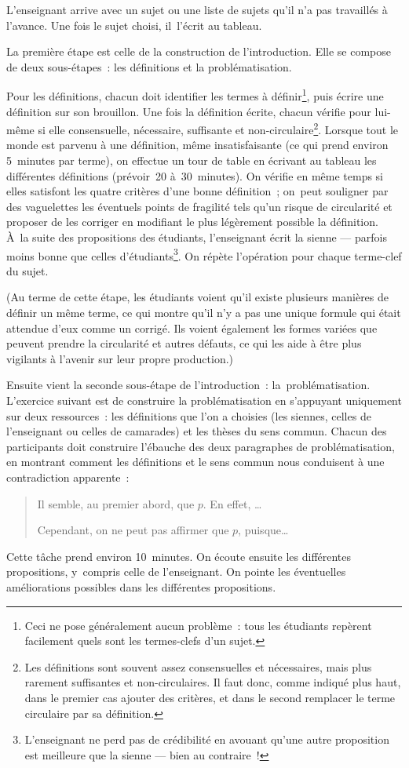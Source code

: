 \documentclass[a4paper,12pt]{report}
\begin{document}
L'enseignant arrive avec un sujet ou une liste de sujets qu'il n'a pas
travaillés à l'avance. Une fois le sujet choisi, il l'écrit au tableau.

La première étape est celle de la construction de l'introduction. Elle
se compose de deux sous-étapes : les définitions et la problématisation.

Pour les définitions, chacun doit identifier les termes à définir\footnote{Ceci ne pose généralement aucun problème : tous les étudiants
repèrent facilement quels sont les termes-clefs d'un sujet.},
puis écrire une définition sur son brouillon. Une fois la définition
écrite, chacun vérifie pour lui-même si elle consensuelle, nécessaire,
suffisante et non-circulaire\footnote{Les définitions sont souvent assez consensuelles et nécessaires,
mais plus rarement suffisantes et non-circulaires. Il faut donc, comme
indiqué plus haut, dans le premier cas ajouter des critères, et dans le
second remplacer le terme circulaire par sa définition.}. Lorsque tout le monde est parvenu à
une définition, même insatisfaisante (ce qui prend environ 5 minutes par
terme), on effectue un tour de table en écrivant au tableau les
différentes définitions (prévoir 20 à 30 minutes). On vérifie en même
temps si elles satisfont les quatre critères d'une bonne définition ;
on peut souligner par des vaguelettes les éventuels points de fragilité
tels qu'un risque de circularité et proposer de les corriger en
modifiant le plus légèrement possible la définition. À la suite des
propositions des étudiants, l'enseignant écrit la sienne — parfois moins
bonne que celles d'étudiants\footnote{L'enseignant ne perd pas de crédibilité en avouant qu'une autre
proposition est meilleure que la sienne --- bien au contraire !}. On répète l'opération pour chaque
terme-clef du sujet.

(Au terme de cette étape, les étudiants voient qu'il existe plusieurs
manières de définir un même terme, ce qui montre qu'il n'y a pas une
unique formule qui était attendue d'eux comme un corrigé. Ils voient
également les formes variées que peuvent prendre la circularité et
autres défauts, ce qui les aide à être plus vigilants à l'avenir sur
leur propre production.)

Ensuite vient la seconde sous-étape de l'introduction :
la problématisation. L'exercice suivant est de construire la
problématisation en s'appuyant uniquement sur deux ressources : les
définitions que l'on a choisies (les siennes, celles de l'enseignant ou
celles de camarades) et les thèses du sens commun. Chacun des
participants doit construire l'ébauche des deux paragraphes de
problématisation, en montrant comment les définitions et le sens commun
nous conduisent à une contradiction apparente :
\begin{quote}
Il semble, au premier abord, que \(p\). En effet, \ldots{}

Cependant, on ne peut pas affirmer que \(p\), puisque\ldots{}
\end{quote}
Cette tâche prend environ 10 minutes. On écoute ensuite les différentes
propositions, y compris celle de l'enseignant. On pointe les éventuelles
améliorations possibles dans les différentes propositions.
\end{document}
